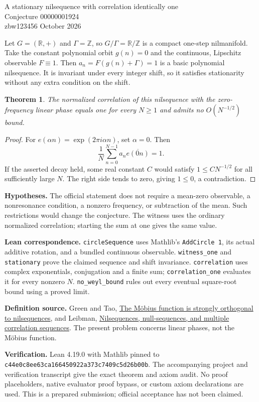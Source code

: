 \documentclass[11pt]{article}
\newtheorem{theorem}{Theorem}
\begin{document}
\begin{center}{\Large A stationary nilsequence with correlation identically one}\\[5pt]{\large Conjecture 00000001924}\\[5pt]zbw123456  October 2026\end{center}

Let $G=(\mathbb R,+)$ and $\Gamma=\mathbb Z$, so $G/\Gamma=\mathbb R/\mathbb Z$ is a compact one-step nilmanifold. Take the constant polynomial orbit $g(n)=0$ and the continuous, Lipschitz observable $F\equiv1$. Then $a_n=F(g(n)+\Gamma)=1$ is a basic polynomial nilsequence. It is invariant under every integer shift, so it satisfies stationarity without any extra condition on the shift.
\begin{theorem}
The normalized correlation of this nilsequence with the zero-frequency linear phase equals one for every $N\ge1$ and admits no $O(N^{-1/2})$ bound.
\end{theorem}
\begin{proof}
For $e(\alpha n)=\exp(2\pi i\alpha n)$, set $\alpha=0$. Then
\[
\frac1N\sum_{n=0}^{N-1} a_n\overline{e(0n)}=1.
\]
If the asserted decay held, some real constant $C$ would satisfy $1\le C N^{-1/2}$ for all sufficiently large $N$. The right side tends to zero, giving $1\le0$, a contradiction.
\end{proof}
\textbf{Hypotheses.} The official statement does not require a mean-zero observable, a nonresonance condition, a nonzero frequency, or subtraction of the mean. Such restrictions would change the conjecture. The witness uses the ordinary normalized correlation; starting the sum at one gives the same value.

\textbf{Lean correspondence.} \texttt{circleSequence} uses Mathlib's \texttt{AddCircle 1}, its actual additive rotation, and a bundled continuous observable. \texttt{witness\_one} and \texttt{stationary} prove the claimed sequence and shift invariance. \texttt{correlation} uses complex exponentials, conjugation and a finite sum; \texttt{correlation\_one} evaluates it for every nonzero $N$. \texttt{no\_weyl\_bound} rules out every eventual square-root bound using a proved limit.

\textbf{Definition source.} Green and Tao, \href{https://arxiv.org/abs/0807.1736}{The M\"obius function is strongly orthogonal to nilsequences}, and Leibman, \href{https://arxiv.org/abs/1205.4004}{Nilsequences, null-sequences, and multiple correlation sequences}. The present problem concerns linear phases, not the M\"obius function.


\textbf{Verification.} Lean 4.19.0 with Mathlib pinned to
\texttt{c44e0c8ee63ca166450922a373c7409c5d26b00b}.
The accompanying project and verification transcript give the exact theorem and axiom audit. No proof placeholders, native evaluator proof bypass, or custom axiom declarations are used. This is a prepared submission; official acceptance has not been claimed.
\end{document}
